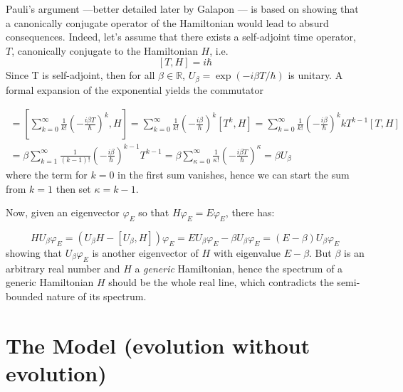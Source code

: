 \documentclass[a0,portrait]{a0poster}
\begin{document}
\begin{multicols}{2}
Pauli's argument ---better detailed later by Galapon \cite{Galapon2002}---
is based on showing that a canonically conjugate operator of the Hamiltonian
would lead to absurd consequences.
Indeed, let's assume that there exists a self-adjoint time operator, $T$, canonically conjugate
to the Hamiltonian $H$, i.e.
\begin{equation}
\label{THcommutator}
[T, H] = i\hbar
\end{equation}
Since T is self-adjoint, then for all
$\beta\in\mathbb{R}$, $U_{\beta} = \exp(- i \beta T / \hbar)$
is unitary. A formal
expansion of the exponential yields the commutator

\begin{multline}
[U_{\beta}, H]  =
\left[
    \sum_{k=0}^{\infty} \frac{1}{k!} \left(- \frac{i\beta T}{\hbar} \right)^k, H
\right]         =
\sum_{k=0}^{\infty} \frac{1}{k!} \left(- \frac{i\beta}{\hbar} \right)^k [T^k, H]
=
\sum_{k=0}^{\infty} \frac{1}{k!} \left(- \frac{i\beta}{\hbar} \right)^k kT^{k-1}[T, H] \\ =
\beta\sum_{k=1}^{\infty} \frac{1}{(k-1)!} \left(- \frac{i\beta}{\hbar} \right)^{k-1} T^{k-1} =
\beta\sum_{\kappa=0}^{\infty} \frac{1}{\kappa!} \left(- \frac{i\beta T}{\hbar} \right)^{\kappa}  =
\beta U_{\beta}
\end{multline}
where the term for $k=0$ in the first sum vanishes, hence we can start the sum from
$k=1$ then set $\kappa=k-1$.

Now, given an eigenvector $\varphi_{E}$ so that $H\varphi_{E}=E\varphi_{E}$, there has:

$$
HU_{\beta}\varphi_{E} = (U_{\beta}H - [U_{\beta}, H])\varphi_{E} =
EU_{\beta}\varphi_{E} - \beta U_{\beta}\varphi_{E} = (E-\beta)U_{\beta}\varphi_{E}
$$
showing that $U_{\beta}\varphi_{E}$ is another eigenvector of $H$ with eigenvalue
$E-\beta$. But $\beta$ is an arbitrary real number and $H$ a \emph{generic} Hamiltonian,
hence the spectrum of a generic Hamiltonian $H$ should
be the whole real line, which contradicts the semi-bounded nature of its spectrum.

\large


\color{DarkSlateGray} %

\section*{The Model (evolution without evolution)}


\end{multicols}
\end{document}
